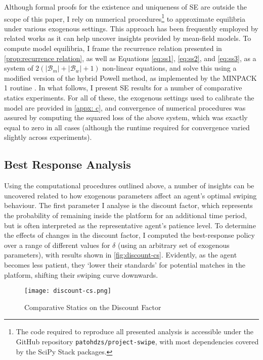 Although formal proofs for the existence and uniqueness of SE are outside the scope of this paper, I rely on numerical procedures\footnote{The code required to reproduce all presented analysis is accessible under the GitHub repository \texttt{patohdzs/project-swipe}, with most dependencies covered by the SciPy Stack packages.} to approximate equilibria under various exogenous settings. 
This approach has been frequently employed by related works \citep[see][]{iyer2014mean, gummadi2011optimal} as it can help uncover insights provided by mean-field models. 
To compute model equilibria, I frame the recurrence relation presented in \autoref{prop:recurrence relation}, as well as Equations \ref{eq:ss1}, \ref{eq:ss2}, and \ref{eq:ss3}, as a system of $2(|\mathcal{B}_m|+|\mathcal{B}_w|+1)$ non-linear equations, and solve this using a modified version of the hybrid Powell method, as implemented by the MINPACK 1 routine \citep{more1980user}. 
In what follows, I present SE results for a number of comparative statics experiments. 
For all of these, the exogenous settings used to calibrate the model are provided in \autoref{appx: c}, and convergence of numerical procedures was assured by computing the squared loss of the above system, which was exactly equal to zero in all cases (although the runtime required for convergence varied slightly across experiments).

\subsection{Best Response Analysis}\label{sec:section3.2} 
Using the computational procedures outlined above, a number of insights can be uncovered related to how exogenous parameters affect an agent's optimal swiping behaviour. 
The first parameter I analyse is the discount factor, which represents the probability of remaining inside the platform for an additional time period, but is often interpreted as the representative agent's patience level.
To determine the effects of changes in the discount factor, I computed the best-response policy over a range of different values for $\delta$ (using an arbitrary set of exogenous parameters), with results shown in \autoref{fig:discount-cs}. 
Evidently, as the agent becomes less patient, they `lower their standards' for potential matches in the platform, shifting their swiping curve downwards. 

\begin{figure}[ht] 
    \centering
    \caption{Comparative Statics on the Discount Factor}
    \texttt{[image: discount-cs.png]}
    \label{fig:discount-cs}
\end{figure} 

